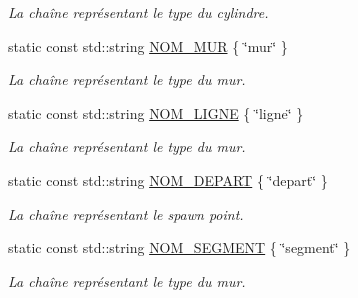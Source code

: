 \begin{DoxyCompactItemize}
\begin{DoxyCompactList}\small\item\em La chaîne représentant le type du cylindre. \end{DoxyCompactList}\item 
\hypertarget{group__inf2990_ga4d9c8c9bfa165dde522834dec2882039}{static const std\-::string \hyperlink{group__inf2990_ga4d9c8c9bfa165dde522834dec2882039}{N\-O\-M\-\_\-\-M\-U\-R} \{ \char`\"{}mur\char`\"{} \}}\label{group__inf2990_ga4d9c8c9bfa165dde522834dec2882039}

\begin{DoxyCompactList}\small\item\em La chaîne représentant le type du mur. \end{DoxyCompactList}\item 
\hypertarget{group__inf2990_ga776d72e2b41b06f1992ba48b1ed3de0b}{static const std\-::string \hyperlink{group__inf2990_ga776d72e2b41b06f1992ba48b1ed3de0b}{N\-O\-M\-\_\-\-L\-I\-G\-N\-E} \{ \char`\"{}ligne\char`\"{} \}}\label{group__inf2990_ga776d72e2b41b06f1992ba48b1ed3de0b}

\begin{DoxyCompactList}\small\item\em La chaîne représentant le type du mur. \end{DoxyCompactList}\item 
\hypertarget{group__inf2990_ga7f23ccbd07f9afea9685f108c4053834}{static const std\-::string \hyperlink{group__inf2990_ga7f23ccbd07f9afea9685f108c4053834}{N\-O\-M\-\_\-\-D\-E\-P\-A\-R\-T} \{ \char`\"{}depart\char`\"{} \}}\label{group__inf2990_ga7f23ccbd07f9afea9685f108c4053834}

\begin{DoxyCompactList}\small\item\em La chaîne représentant le spawn point. \end{DoxyCompactList}\item 
\hypertarget{group__inf2990_gaffe953e9369343040aa5d1b72510d810}{static const std\-::string \hyperlink{group__inf2990_gaffe953e9369343040aa5d1b72510d810}{N\-O\-M\-\_\-\-S\-E\-G\-M\-E\-N\-T} \{ \char`\"{}segment\char`\"{} \}}\label{group__inf2990_gaffe953e9369343040aa5d1b72510d810}

\begin{DoxyCompactList}\small\item\em La chaîne représentant le type du mur. \end{DoxyCompactList}\end{DoxyCompactItemize}
